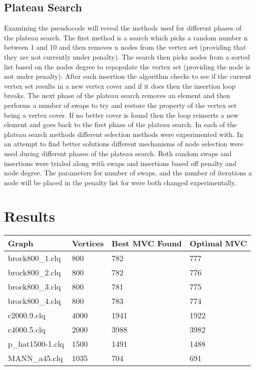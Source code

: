 \documentclass[conference,letterpaper]{IEEEtran}
\begin{document}
\subsection{Plateau Search}
Examining the pseudocode will reveal the methods used for different phases of the plateau search. The first method is a search which picks a random number n between 1 and 10 and then removes n nodes from the vertex set (providing that they are not currently under penalty). The search then picks nodes from a sorted list based on the nodes degree to repopulate the vertex set (providing the node is not under penalty). After each insertion the algorithm checks to see if the current vertex set results in a new vertex cover and if it does then the insertion loop breaks. The next phase of the plateau search removes an element and then performs a number of swaps to try and restore the property of the vertex set being a vertex cover. If no better cover is found then the loop reinserts a new element and goes back to the first phase of the plateau search. In each of the plateau search methods different selection methods were experimented with. In an attempt to find better solutions different mechanisms of node selection were used during different phases of the plateau search. Both random swaps and insertions were trialed along with swaps and insertions based off penalty and node degree. The parameters for number of swaps, and the number of iterations a node will be placed in the penalty list for were both changed experimentally.

\section{Results}
\begin{table}[!h]
    \begin{tabularx}{\linewidth}{|X|X|X|X|}
    \hline
    Graph   & Vertices & Best MVC Found & Optimal MVC \\ \hline
    brock800\_1.clq  & 800 & 782                     & 777  \\
    brock800\_2.clq  & 800 & 782                     & 776  \\
    brock800\_3.clq  & 800 & 781                     & 775  \\
    brock800\_4.clq  & 800 & 783                     & 774  \\
    c2000.9.clq      & 4000 & 1941                    & 1922 \\
    c4000.5.clq      & 2000 & 3988                    & 3982 \\
    p\_hat1500-1.clq & 1500 & 1491                    & 1488 \\
    MANN\_a45.clq    & 1035 & 704                     & 691  \\ \hline
    \end{tabularx}
\end{table}
\end{document}
